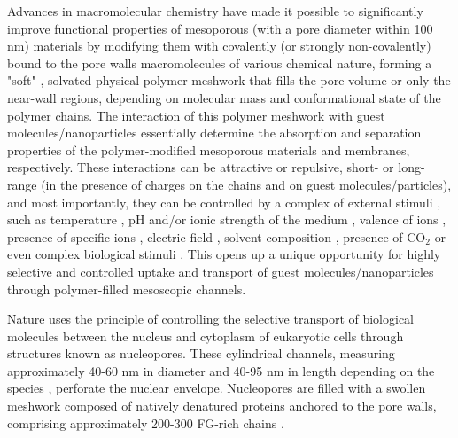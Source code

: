 \documentclass[12pt, a4paper]{article}
\begin{document}
Advances in macromolecular chemistry have made it possible to significantly improve functional properties of mesoporous (with a pore diameter within 100 nm) 
materials by modifying them with covalently (or strongly non-covalently) bound to the pore walls macromolecules of various chemical nature, forming a "soft" , solvated physical polymer meshwork that fills the pore volume or only the near-wall regions, depending on molecular mass and conformational state of the polymer chains.
The interaction of this polymer meshwork with guest molecules/nanoparticles 
essentially determine the absorption and separation properties of the polymer-modified mesoporous materials and membranes, respectively. 
These interactions can be attractive or repulsive, short- or long-range (in the presence of charges on the chains and on guest molecules/particles), and most importantly, 
they can be controlled by a complex of external stimuli \cite{Jeong2002, Lee2010, Low2019}, 
such as temperature                     \cite{Stetsyshyn2020}, 
pH and/or ionic strength of the medium  \cite{Dai2008, Zhang2005}, 
valence of ions                         \cite{Zhulina1999}, 
presence of specific ions               \cite{Robertson2021}, 
electric field                          \cite{Lokuge2005}, 
solvent composition                     \cite{Halperin2011}, 
presence of $\text{CO}_2$               \cite{Darabi2016} 
or even complex biological stimuli      \cite{Ikeda2010, Lu2003}.
This opens up a unique opportunity for highly selective and controlled uptake and transport of guest molecules/nanoparticles through polymer-filled mesoscopic channels. 

Nature uses the principle of controlling the selective transport of biological molecules between the nucleus and cytoplasm of eukaryotic cells through structures known as nucleopores.
These cylindrical channels, measuring approximately 40-60 nm in diameter and 40-95 nm in length depending on the species \cite{Yang1998, Beck2004, VonAppen2015, Alberts2015, Hayama2017, Holzer2018}, perforate the nuclear envelope.
Nucleopores are filled with a swollen meshwork composed of natively denatured proteins anchored to the pore walls, comprising approximately 200-300 FG-rich chains \cite{Holzer2018, Ori2013, Rout2000, Dickmanns2015}.
\end{document}
